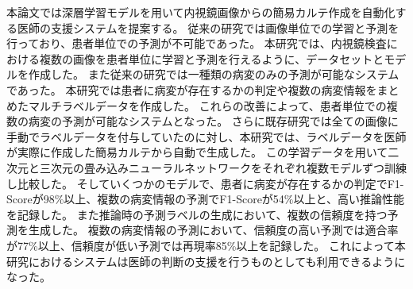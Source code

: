 本論文では深層学習モデルを用いて内視鏡画像からの簡易カルテ作成を自動化する医師の支援システムを提案する。
従来の研究では画像単位での学習と予測を行っており、患者単位での予測が不可能であった。
本研究では、内視鏡検査における複数の画像を患者単位に学習と予測を行えるように、データセットとモデルを作成した。
また従来の研究では一種類の病変のみの予測が可能なシステムであった。
本研究では患者に病変が存在するかの判定や複数の病変情報をまとめたマルチラベルデータを作成した。
これらの改善によって、患者単位での複数の病変の予測が可能なシステムとなった。
さらに既存研究では全ての画像に手動でラベルデータを付与していたのに対し、本研究では、ラベルデータを医師が実際に作成した簡易カルテから自動で生成した。
この学習データを用いて二次元と三次元の畳み込みニューラルネットワークをそれぞれ複数モデルずつ訓練し比較した。
そしていくつかのモデルで、患者に病変が存在するかの判定でF1-Scoreが98\%以上、複数の病変情報の予測でF1-Scoreが54\%以上と、高い推論性能を記録した。
また推論時の予測ラベルの生成において、複数の信頼度を持つ予測を生成した。
複数の病変情報の予測において、信頼度の高い予測では適合率が77\%以上、信頼度が低い予測では再現率85\%以上を記録した。
これによって本研究におけるシステムは医師の判断の支援を行うものとしても利用できるようになった。
